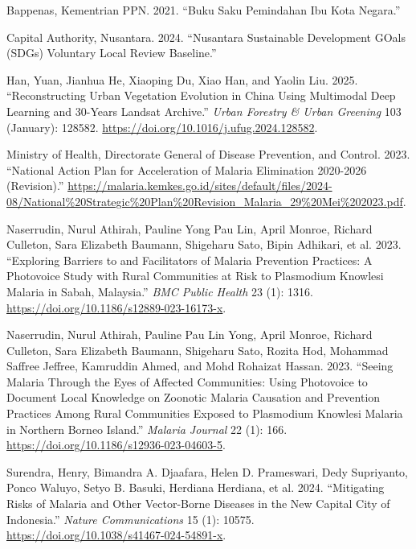 \documentclass[
  letterpaper,
  DIV=11,
  numbers=noendperiod]{scrreprt}
\newlength{\cslhangindent}
\newlength{\cslentryspacingunit} %
\newenvironment{CSLReferences}[2] %
 {%
  \setlength{\parindent}{0pt}
  \ifodd #1
  \let\oldpar\par
  \def\par{\hangindent=\cslhangindent\oldpar}
  \fi
  \setlength{\parskip}{#2\cslentryspacingunit}
 }%
 {}
\begin{document}
\hypertarget{refs}{}
\begin{CSLReferences}{1}{0}
\leavevmode{}%
Bappenas, Kementrian PPN. 2021. {``Buku Saku Pemindahan Ibu Kota
Negara.''}

\leavevmode{}%
Capital Authority, Nusantara. 2024. {``Nusantara Sustainable Development
GOals (SDGs) Voluntary Local Review Baseline.''}

\leavevmode{}%
Han, Yuan, Jianhua He, Xiaoping Du, Xiao Han, and Yaolin Liu. 2025.
{``Reconstructing Urban Vegetation Evolution in China Using Multimodal
Deep Learning and 30-Years Landsat Archive.''} \emph{Urban Forestry \&
Urban Greening} 103 (January): 128582.
\url{https://doi.org/10.1016/j.ufug.2024.128582}.

\leavevmode{}%
Ministry of Health, Directorate General of Disease Prevention, and
Control. 2023. {``National Action Plan for Acceleration of Malaria
Elimination 2020-2026 (Revision).''}
\url{https://malaria.kemkes.go.id/sites/default/files/2024-08/National\%20Strategic\%20Plan\%20Revision_Malaria_29\%20Mei\%202023.pdf}.

\leavevmode{}%
Naserrudin, Nurul Athirah, Pauline Yong Pau Lin, April Monroe, Richard
Culleton, Sara Elizabeth Baumann, Shigeharu Sato, Bipin Adhikari, et al.
2023. {``Exploring Barriers to and Facilitators of Malaria Prevention
Practices: A Photovoice Study with Rural Communities at Risk to
Plasmodium Knowlesi Malaria in Sabah, Malaysia.''} \emph{BMC Public
Health} 23 (1): 1316. \url{https://doi.org/10.1186/s12889-023-16173-x}.

\leavevmode{}%
Naserrudin, Nurul Athirah, Pauline Pau Lin Yong, April Monroe, Richard
Culleton, Sara Elizabeth Baumann, Shigeharu Sato, Rozita Hod, Mohammad
Saffree Jeffree, Kamruddin Ahmed, and Mohd Rohaizat Hassan. 2023.
{``Seeing Malaria Through the Eyes of Affected Communities: Using
Photovoice to Document Local Knowledge on Zoonotic Malaria Causation and
Prevention Practices Among Rural Communities Exposed to Plasmodium
Knowlesi Malaria in Northern Borneo Island.''} \emph{Malaria Journal} 22
(1): 166. \url{https://doi.org/10.1186/s12936-023-04603-5}.

\leavevmode{}%
Surendra, Henry, Bimandra A. Djaafara, Helen D. Prameswari, Dedy
Supriyanto, Ponco Waluyo, Setyo B. Basuki, Herdiana Herdiana, et al.
2024. {``Mitigating Risks of Malaria and Other Vector-Borne Diseases in
the New Capital City of Indonesia.''} \emph{Nature Communications} 15
(1): 10575. \url{https://doi.org/10.1038/s41467-024-54891-x}.


\end{CSLReferences}
\end{document}
